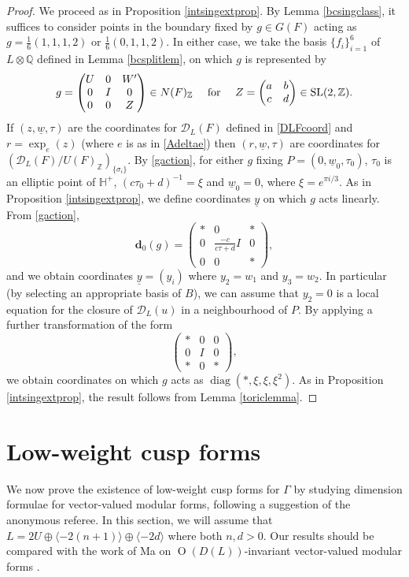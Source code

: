 \documentclass[12pt, a4paper]{article}
\newcommand{\ZZ}{\mathbb{Z}}
\newcommand{\QQ}{\mathbb{Q}}
\newcommand{\HH}{\mathbb{H}}
\newcommand{\la}{\langle}
\newcommand{\ra}{\rangle}
\newcommand{\dc}{\mathcal{D}}
\newcommand{\opn}{\operatorname}
\newcommand{\op}{\oplus}
\newcommand{\bpm}{\begin{pmatrix}}
\newcommand{\epm}{\end{pmatrix}}
\begin{document}
\begin{proof}
  We proceed as in Proposition \ref{intsingextprop}.
  By Lemma \ref{bcsingclass}, it suffices to consider points in the boundary fixed by $g \in G(F)$ acting as $g = \frac{1}{6}(1,1,1,2)$ or $\frac{1}{6}(0,1,1,2)$.
 In either case, we take the basis $\{f_i\}_{i=1}^6$ of $L \otimes \QQ$ defined in Lemma \ref{bcsplitlem}, on which $g$ is represented by 
\[
 \begin{array}{c c c}
      g =
      \bpm
      U & 0 & W' \\
      0 & I & 0 \\
      0 & 0 & Z
      \epm
      \in N(F)_{\ZZ}
      & \text{ for } &
      Z= \bpm
      a & b \\ c & d
      \epm \in \opn{SL}(2, \ZZ).
    \end{array}
  \]
  If $(z, \underline{w}, \tau)$ are the coordinates for $\dc_L(F)$ defined in  \eqref{DLFcoord} and  $r=\opn{exp}_e(z)$ (where $e$ is as in \eqref{Adeltae}) then $(r, \underline{w}, \tau)$  are  coordinates for $(\dc_L(F)/U(F)_{\ZZ})_{\{\sigma_i\}}$.
  By \eqref{gaction}, for either $g$ fixing $P=(0, \underline{w}_0, \tau_0)$, $\tau_0$ is an elliptic point of $\HH^+$,
  $(c \tau_0 + d)^{-1}=\xi$
  and
  $\underline{w}_0 = 0$, 
  where $\xi=e^{\pi i /3}$. 
  As in Proposition \ref{intsingextprop}, we define coordinates $\underline{y}$ on which $g$ acts linearly.
  From \eqref{gaction}, 
  \[
  \textbf{d}_0(g) =
  \bpm
  * & 0 & * \\
  0 & \frac{-c}{c \tau+d} I & 0 \\
  0 & 0 & * 
  \epm,
  \]
  and we obtain coordinates $\underline{y}=(y_i)$  where $y_2 = w_1$ and $y_3 = w_2$.
  In particular (by selecting an appropriate basis of $B$), we can assume that  $y_2=0$ is a local equation for the closure of $\dc_L(u)$ in a neighbourhood of $P$.
  By applying a further transformation of the form
  \[
  \bpm
  * & 0 & 0 \\
  0 & I & 0 \\
  * & 0 & *
  \epm,
  \]
  we obtain coordinates on which $g$ acts as $\opn{diag}(*, \xi, \xi, \xi^2)$.
  As in Proposition \ref{intsingextprop}, the result follows from Lemma \ref{toriclemma}.




\end{proof}
 \section{Low-weight cusp forms}\label{lwcfsec}
We now prove the existence of low-weight cusp forms for $\Gamma$ by studying dimension formulae for vector-valued modular forms, following a suggestion of the anonymous referee.
In this section, we will assume that $L=2U \op \la -2(n+1) \ra \op \la -2d \ra$ where both $n,d>0$.
Our results should be compared with the work of Ma on $\opn{O}(D(L))$-invariant vector-valued modular forms \cite{MaGauss}.
\end{document}
